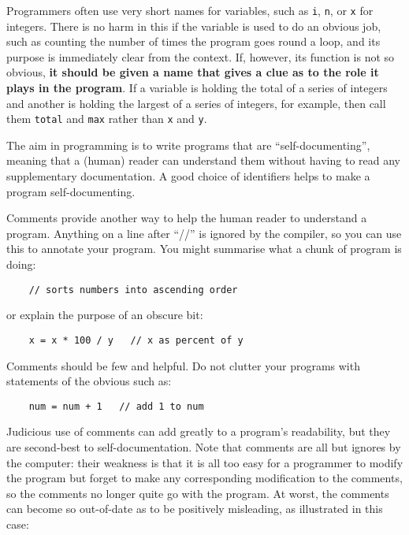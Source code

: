 Programmers often use very short names for variables, such as
\verb!i!, \verb!n!, or 
\verb!x! for integers.  There is no harm in this if the variable is used to
do an obvious job, such as counting the number of times the program goes round
a loop, and its purpose is immediately clear from the context.  If, however, its
function is not so obvious, \textbf{it should be given a name that
gives a clue as to the role it plays in the program}.  If a variable is
holding the total of a series of integers and another is holding the
largest of a series of integers, for example, then call them \verb!total!
and \verb!max! rather than \verb!x! and \verb!y!.

The aim in programming is to write programs that are ``self-documenting'',
meaning that a (human) reader can understand them without having to read
any supplementary documentation.  A good choice of identifiers helps to
make a program self-documenting.

Comments provide another way to help the human reader to understand a
program.  Anything on a line after ``//'' is ignored by the compiler,
so you can use this to annotate your program.  You might summarise
what a chunk of program is doing:

\begin{Verbatim}
    // sorts numbers into ascending order
\end{Verbatim}

or explain the purpose of an obscure bit:

\begin{Verbatim}
    x = x * 100 / y   // x as percent of y
\end{Verbatim}

Comments should be few and helpful.  Do not clutter your programs with
statements of the obvious such as:

\begin{Verbatim}
    num = num + 1   // add 1 to num
\end{Verbatim}

Judicious use of comments can add greatly to a program's readability, but they
are second-best to self-documentation. Note that comments are all but
ignores by the computer: their weakness is that it is all too
easy for a programmer to modify the program but forget to make any
corresponding modification to the comments, so the comments no longer quite
go with the program. At worst, the comments can become so out-of-date as
to be positively misleading, as illustrated in this case: 

